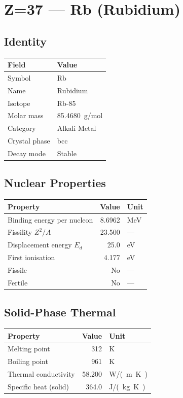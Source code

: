 \documentclass[11pt,a4paper]{article}
\begin{document}
\newpage

\section{Z=37 --- Rb (Rubidium)}
\label{sec:Z37}

\subsection{Identity}
\begin{tabular}{ll}
  \toprule
  Field & Value \\
  \midrule
  Symbol & Rb \\
  Name & Rubidium \\
  Isotope & Rb-85 \\
  Molar mass & \SI{85.4680}{g/mol} \\
  Category & Alkali Metal \\
  Crystal phase & bcc \\
  Decay mode & Stable \\
  \bottomrule
\end{tabular}

\subsection{Nuclear Properties}
\begin{tabular}{lrl}
  \toprule
  Property & Value & Unit \\
  \midrule
  Binding energy per nucleon & 8.6962 & \si{MeV} \\
  Fissility $Z^2/A$ & 23.500 & --- \\
  Displacement energy $E_d$ & 25.0 & \si{eV} \\
  First ionisation & 4.177 & \si{eV} \\
  Fissile & No & --- \\
  Fertile & No & --- \\
  \bottomrule
\end{tabular}

\subsection{Solid-Phase Thermal}
\begin{tabular}{lrl}
  \toprule
  Property & Value & Unit \\
  \midrule
  Melting point & 312 & \si{K} \\
  Boiling point & 961 & \si{K} \\
  Thermal conductivity & 58.200 & \si{W/(m.K)} \\
  Specific heat (solid) & 364.0 & \si{J/(kg.K)} \\
  \bottomrule
\end{tabular}
\end{document}
